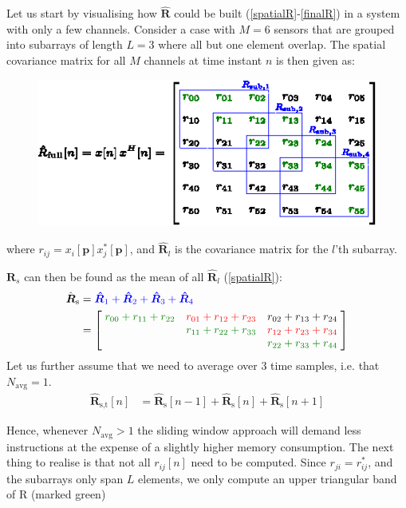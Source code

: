 \documentclass[12pt,journal,captionsoff,onecolumn]{IEEEtran}
\newcommand\Green[1]{{\color{Green}#1}}
\renewcommand\vec[1]{\boldsymbol{#1}}
\newcommand\mat[1]{\boldsymbol{#1}}
\newcommand\1{\vec 1}
\newcommand*\p{\vec p}
\newcommand*\R{\mat R}
\newcommand*\eR{\mat{\hat R}}
\begin{document}
Let us start by visualising how $\eR$ could be built (\ref{spatialR}-\ref{finalR}) in a system with only a few channels. Consider a case with $M=6$ sensors that are grouped into subarrays of length $L=3$ where all but one element overlap. The spatial covariance matrix for all $M$ channels at time instant $n$ is then given as:
\begin{figure}[H]
\includegraphics[width=\linewidth]{gfx/capon_build_R_full.eps}
\end{figure}
where $r_{ij} = x_i[\p]x_j^*[\p]$, and $\eR_{l}$ is the covariance matrix for the $l$'th subarray.

$\R_s$ can then be found as the mean of all $\eR_l$ (\ref{spatialR}):
{\renewcommand*{\arraystretch}{1.8}
\begin{align*}
\hat{\mat R}_\text{s} &= \color{Blue}\eR_1 + \eR_2 + \eR_3 + \eR_4 \\
&= \left[\;
\begin{matrix}
\color{Green}r_{00}+r_{11}+r_{22} & \color{Red}r_{01}+r_{12}+r_{23} & r_{02}+r_{13}+r_{24} \\
                                       & \color{Green}r_{11}+r_{22}+r_{33} & \color{Red}r_{12}+r_{23}+r_{34} \\
                                       &                                        & \color{Green}r_{22}+r_{33}+r_{44}
\end{matrix}
\;\right]
\end{align*}}%
Let us further assume that we need to average over 3 time samples, i.e. that $N_{\text{avg}} = 1$. 
\begin{align*}
\eR_\text{s,t}[n] &= \eR_\text{s}[n-1] + \eR_\text{s}[n] + \eR_\text{s}[n+1]
\end{align*}%


Hence, whenever $N_\text{avg}>1$ the sliding window approach will demand less instructions at the expense of a slightly higher memory consumption. The next thing to realise is that not all $r_{ij}[n]$ need to be computed. Since $r_{ji} = r^*_{ij}$, and the subarrays only span $L$ elements, we only compute an upper triangular band of R (marked \Green{green})
\end{document}
